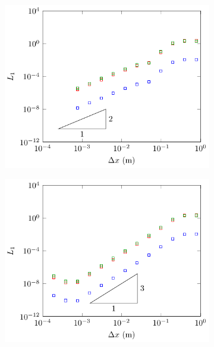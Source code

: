 \begin{figure}
\begin{subfigure}{0.5\textwidth}
		\includegraphics[width=\textwidth]{./chp5/figures/Analytic/Soliton/L1/FEVM2.pdf}
	\end{subfigure}%
	\begin{subfigure}{0.5\textwidth}
		\includegraphics[width=\textwidth]{./chp5/figures/Analytic/Soliton/L1/FDVM3.pdf}
	\end{subfigure}
	\begin{subfigure}{0.5\textwidth}

\end{subfigure}
\end{figure}
